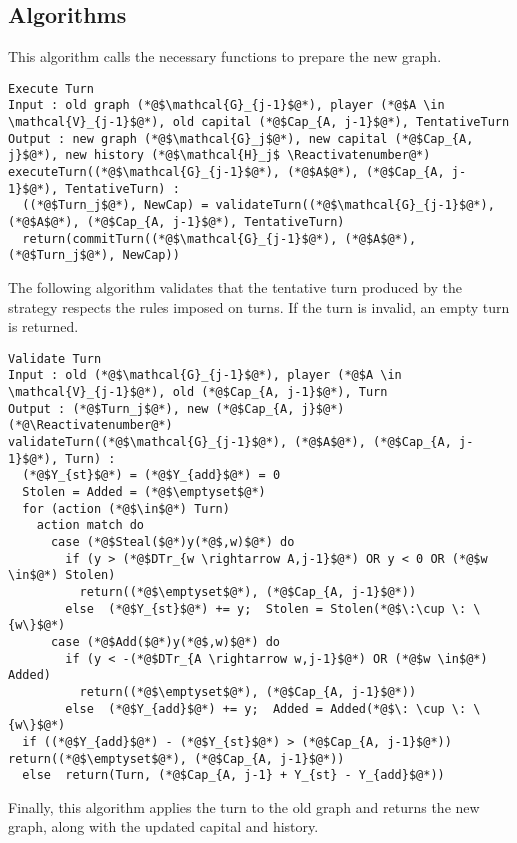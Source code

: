 \documentclass[11pt]{llncs}
\makeatletter
\newcommand*\Suppressnumber{%
  \lst@AddToHook{OnNewLine}{%
    \let\thelstnumber\relax%
     \advance\c@lstnumber-\@ne\relax%
    }%
}
\theoremstyle{definition}
\makeatother
\begin{document}
  \subsection{Algorithms}
    This algorithm calls the necessary functions to prepare the new graph.
    \Suppressnumber
    \begin{lstlisting}[label=executeturn, style=numbers]
Execute Turn
Input : old graph (*@$\mathcal{G}_{j-1}$@*), player (*@$A \in \mathcal{V}_{j-1}$@*), old capital (*@$Cap_{A, j-1}$@*), TentativeTurn
Output : new graph (*@$\mathcal{G}_j$@*), new capital (*@$Cap_{A, j}$@*), new history (*@$\mathcal{H}_j$ \Reactivatenumber@*)
executeTurn((*@$\mathcal{G}_{j-1}$@*), (*@$A$@*), (*@$Cap_{A, j-1}$@*), TentativeTurn) :
  ((*@$Turn_j$@*), NewCap) = validateTurn((*@$\mathcal{G}_{j-1}$@*), (*@$A$@*), (*@$Cap_{A, j-1}$@*), TentativeTurn)
  return(commitTurn((*@$\mathcal{G}_{j-1}$@*), (*@$A$@*), (*@$Turn_j$@*), NewCap))
    \end{lstlisting}
    The following algorithm validates that the tentative turn produced by the strategy respects the rules imposed on turns.
    If the turn is invalid, an empty turn is returned.
    \Suppressnumber
    \begin{lstlisting}[label=validateturn, style=numbers]
Validate Turn
Input : old (*@$\mathcal{G}_{j-1}$@*), player (*@$A \in \mathcal{V}_{j-1}$@*), old (*@$Cap_{A, j-1}$@*), Turn
Output : (*@$Turn_j$@*), new (*@$Cap_{A, j}$@*) (*@\Reactivatenumber@*)
validateTurn((*@$\mathcal{G}_{j-1}$@*), (*@$A$@*), (*@$Cap_{A, j-1}$@*), Turn) :
  (*@$Y_{st}$@*) = (*@$Y_{add}$@*) = 0
  Stolen = Added = (*@$\emptyset$@*)
  for (action (*@$\in$@*) Turn)
    action match do
      case (*@$Steal($@*)y(*@$,w)$@*) do
        if (y > (*@$DTr_{w \rightarrow A,j-1}$@*) OR y < 0 OR (*@$w \in$@*) Stolen)
          return((*@$\emptyset$@*), (*@$Cap_{A, j-1}$@*))
        else  (*@$Y_{st}$@*) += y;  Stolen = Stolen(*@$\:\cup \: \{w\}$@*)
      case (*@$Add($@*)y(*@$,w)$@*) do
        if (y < -(*@$DTr_{A \rightarrow w,j-1}$@*) OR (*@$w \in$@*) Added)
          return((*@$\emptyset$@*), (*@$Cap_{A, j-1}$@*))
        else  (*@$Y_{add}$@*) += y;  Added = Added(*@$\: \cup \: \{w\}$@*)
  if ((*@$Y_{add}$@*) - (*@$Y_{st}$@*) > (*@$Cap_{A, j-1}$@*))  return((*@$\emptyset$@*), (*@$Cap_{A, j-1}$@*))
  else  return(Turn, (*@$Cap_{A, j-1} + Y_{st} - Y_{add}$@*))
    \end{lstlisting}
    Finally, this algorithm applies the turn to the old graph and returns the new graph, along with the updated capital and
    history.
    \Suppressnumber
\end{document}
